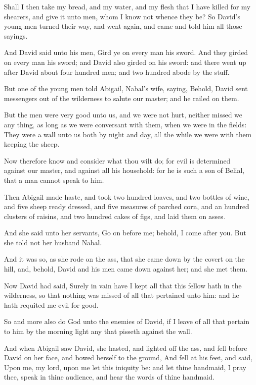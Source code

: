 \Verse Shall I then take my bread, and my water, and my flesh that I have killed for my shearers, and give it unto men, whom I know not whence they be?  \Verse So David's young men turned their way, and went again, and came and told him all those sayings.

\Verse And David said unto his men, Gird ye on every man his sword. And they girded on every man his sword; and David also girded on his sword: and there went up after David about four hundred men; and two hundred abode by the stuff.

\Verse But one of the young men told Abigail, Nabal's wife, saying, Behold, David sent messengers out of the wilderness to salute our master; and he railed on them.

\Verse But the men were very good unto us, and we were not hurt, neither missed we any thing, as long as we were conversant with them, when we were in the fields: \Verse They were a wall unto us both by night and day, all the while we were with them keeping the sheep.

\Verse Now therefore know and consider what thou wilt do; for evil is determined against our master, and against all his household: for he is such a son of Belial, that a man cannot speak to him.

\Verse Then Abigail made haste, and took two hundred loaves, and two bottles of wine, and five sheep ready dressed, and five measures of parched corn, and an hundred clusters of raisins, and two hundred cakes of figs, and laid them on asses.

\Verse And she said unto her servants, Go on before me; behold, I come after you. But she told not her husband Nabal.

\Verse And it was so, as she rode on the ass, that she came down by the covert on the hill, and, behold, David and his men came down against her; and she met them.

\Verse Now David had said, Surely in vain have I kept all that this fellow hath in the wilderness, so that nothing was missed of all that pertained unto him: and he hath requited me evil for good.

\Verse So and more also do God unto the enemies of David, if I leave of all that pertain to him by the morning light any that pisseth against the wall.

\Verse And when Abigail saw David, she hasted, and lighted off the ass, and fell before David on her face, and bowed herself to the ground, \Verse And fell at his feet, and said, Upon me, my lord, upon me let this iniquity be: and let thine handmaid, I pray thee, speak in thine audience, and hear the words of thine handmaid.

